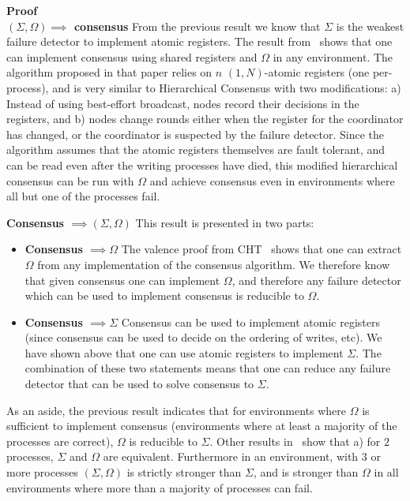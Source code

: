 \textbf{Proof}\\
\textbf{$(\Sigma, \Omega) \implies$ consensus} From the previous result we know that $\Sigma$ is the weakest failure
detector to implement atomic registers. The result from~\cite{lo1994using} shows that one can implement consensus using
shared registers and $\Omega$ in any environment. The algorithm proposed in that paper relies on $n$ $(1,N)$-atomic
registers (one per-process), and is very similar to Hierarchical Consensus with two modifications: a) Instead of using
best-effort broadcast, nodes record their decisions in the registers, and b) nodes change rounds either when the
register for the coordinator has changed, or the coordinator is suspected by the failure detector. Since the algorithm
assumes that the atomic registers themselves are fault tolerant, and can be read even after the writing processes have
died, this modified hierarchical consensus can be run with $\Omega$ and achieve consensus even in environments where all
but one of the processes fail.

\textbf{Consensus $\implies (\Sigma, \Omega)$} This result is presented in two parts:
\begin{itemize}
\item \textbf{Consensus $\implies \Omega$} The valence proof from CHT~\cite{chandra1996weakest} shows that one can
extract $\Omega$ from any implementation of the consensus algorithm. We therefore know that given consensus one can
implement $\Omega$, and therefore any failure detector which can be used to implement consensus is reducible to
$\Omega$.
\item \textbf{Consensus $\implies \Sigma$} Consensus can be used to implement atomic registers (since consensus can be
used to decide on the ordering of writes, etc). We have shown above that one can use atomic registers to implement
$\Sigma$. The combination of these two statements means that one can reduce any failure detector that can be used to
solve consensus to $\Sigma$.
\end{itemize}
As an aside, the previous result indicates that for environments where $\Omega$ is sufficient to implement consensus
(\ie environments where at least a majority of the processes are correct), $\Omega$ is reducible to $\Sigma$. Other
results in~\cite{delporte2003shared} show that a) for $2$ processes, $\Sigma$ and $\Omega$ are equivalent. Furthermore
in an environment, with $3$ or more processes $(\Sigma, \Omega)$ is strictly stronger than $\Sigma$, and is stronger
than $\Omega$ in all environments where more than a majority of processes can fail.

